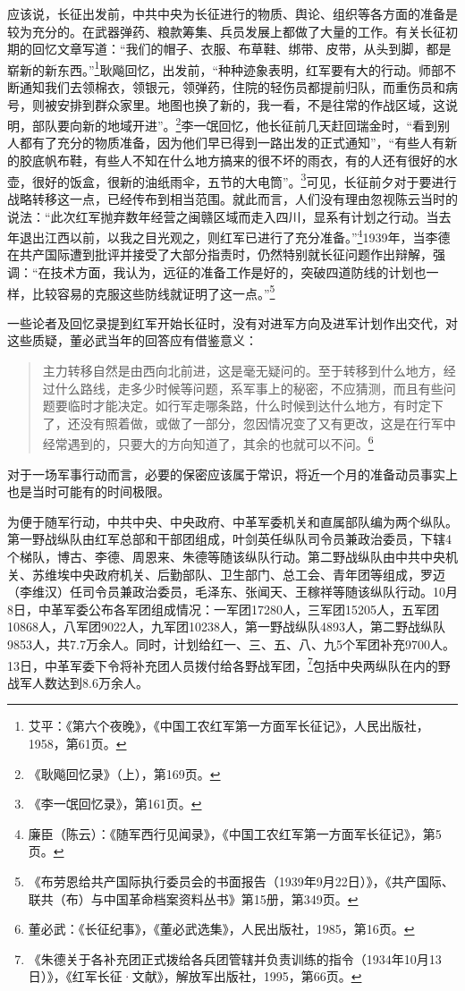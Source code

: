 应该说，长征出发前，中共中央为长征进行的物质、舆论、组织等各方面的准备是较为充分的。在武器弹药、粮款筹集、兵员发展上都做了大量的工作。有关长征初期的回忆文章写道：“我们的帽子、衣服、布草鞋、绑带、皮带，从头到脚，都是崭新的新东西。”\footnote{艾平：《第六个夜晚》，《中国工农红军第一方面军长征记》，人民出版社，1958，第61页。}耿飚回忆，出发前，“种种迹象表明，红军要有大的行动。师部不断通知我们去领棉衣，领银元，领弹药，住院的轻伤员都提前归队，而重伤员和病号，则被安排到群众家里。地图也换了新的，我一看，不是往常的作战区域，这说明，部队要向新的地域开进”。\footnote{《耿飚回忆录》（上），第169页。}李一氓回忆，他长征前几天赶回瑞金时，“看到别人都有了充分的物质准备，因为他们早已得到一路出发的正式通知”，“有些人有新的胶底帆布鞋，有些人不知在什么地方搞来的很不坏的雨衣，有的人还有很好的水壶，很好的饭盒，很新的油纸雨伞，五节的大电筒”。\footnote{《李一氓回忆录》，第161页。}可见，长征前夕对于要进行战略转移这一点，已经传布到相当范围。就此而言，人们没有理由忽视陈云当时的说法：“此次红军抛弃数年经营之闽赣区域而走入四川，显系有计划之行动。当去年退出江西以前，以我之目光观之，则红军已进行了充分准备。”\footnote{廉臣（陈云）：《随军西行见闻录》，《中国工农红军第一方面军长征记》，第5页。}1939年，当李德在共产国际遭到批评并接受了大部分指责时，仍然特别就长征问题作出辩解，强调：“在技术方面，我认为，远征的准备工作是好的，突破四道防线的计划也一样，比较容易的克服这些防线就证明了这一点。”\footnote{《布劳恩给共产国际执行委员会的书面报告（1939年9月22日）》，《共产国际、联共（布）与中国革命档案资料丛书》第15册，第349页。}


一些论者及回忆录提到红军开始长征时，没有对进军方向及进军计划作出交代，对这些质疑，董必武当年的回答应有借鉴意义：

\begin{quote}

主力转移自然是由西向北前进，这是毫无疑问的。至于转移到什么地方，经过什么路线，走多少时候等问题，系军事上的秘密，不应猜测，而且有些问题要临时才能决定。如行军走哪条路，什么时候到达什么地方，有时定下了，还没有照着做，或做了一部分，忽因情况变了又有更改，这是在行军中经常遇到的，只要大的方向知道了，其余的也就可以不问。\footnote{董必武：《长征纪事》，《董必武选集》，人民出版社，1985，第16页。}
\end{quote}


对于一场军事行动而言，必要的保密应该属于常识，将近一个月的准备动员事实上也是当时可能有的时间极限。


为便于随军行动，中共中央、中央政府、中革军委机关和直属部队编为两个纵队。第一野战纵队由红军总部和干部团组成，叶剑英任纵队司令员兼政治委员，下辖4个梯队，博古、李德、周恩来、朱德等随该纵队行动。第二野战纵队由中共中央机关、苏维埃中央政府机关、后勤部队、卫生部门、总工会、青年团等组成，罗迈（李维汉）任司令员兼政治委员，毛泽东、张闻天、王稼祥等随该纵队行动。10月8日，中革军委公布各军团组成情况：一军团17280人，三军团15205人，五军团10868人，八军团9022人，九军团10238人，第一野战纵队4893人，第二野战纵队9853人，共7.7万余人。同时，计划给红一、三、五、八、九5个军团补充9700人。13日，中革军委下令将补充团人员拨付给各野战军团，\footnote{《朱德关于各补充团正式拨给各兵团管辖并负责训练的指令（1934年10月13日）》，《红军长征·文献》，解放军出版社，1995，第66页。}包括中央两纵队在内的野战军人数达到8.6万余人。


